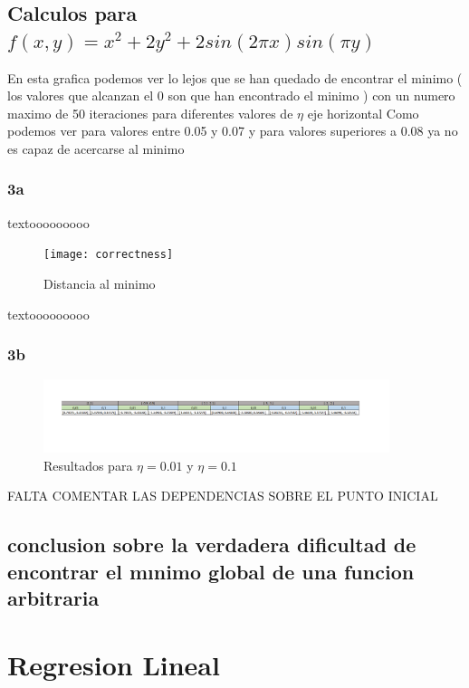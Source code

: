 \subsection{Calculos para $f(x,y) = x^2+2y^2+2sin(2 \pi x)sin(\pi y)$}

En esta grafica podemos ver lo lejos que se han quedado de encontrar
 el minimo ( los valores que alcanzan el 0 son que han encontrado el minimo ) con un numero maximo de 50 iteraciones para diferentes valores de  $\eta$ eje horizontal
 Como podemos ver para valores entre 0.05 y 0.07 y para valores superiores a 0.08 ya no es capaz de acercarse al minimo
\subsubsection{3a}
textooooooooo
 \begin{figure}[h]
  \centering
  \texttt{[image: correctness]}
  \caption{Distancia al minimo}
  \label{fig:eta1}
\end{figure}
textooooooooo


\subsubsection{3b}
\begin{figure}[h]
  \centering
  \includegraphics[width=0.90\textwidth]{Exvelpng}
  \caption{Resultados para $\eta = 0.01 $ y $ \eta = 0.1$}
  \label{fig:eta1}
\end{figure}
  
FALTA COMENTAR LAS DEPENDENCIAS SOBRE EL PUNTO INICIAL

\subsection{ conclusion sobre la verdadera dificultad de encontrar el mınimo
global de una funcion arbitraria}

\section{Regresion Lineal}







